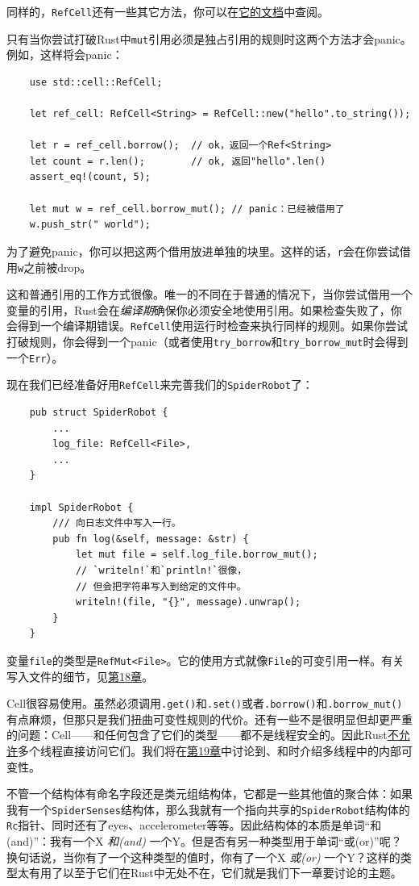 同样的，\texttt{RefCell}还有一些其它方法，你可以在\href{https://doc.rust-lang.org/std/cell/struct.RefCell.html}{它的文档}中查阅。

只有当你尝试打破Rust中\texttt{mut}引用必须是独占引用的规则时这两个方法才会panic。例如，这样将会panic：
\begin{verbatim}
    use std::cell::RefCell;

    let ref_cell: RefCell<String> = RefCell::new("hello".to_string());

    let r = ref_cell.borrow();  // ok，返回一个Ref<String>
    let count = r.len();        // ok, 返回"hello".len()
    assert_eq!(count, 5);       

    let mut w = ref_cell.borrow_mut(); // panic：已经被借用了
    w.push_str(" world");
\end{verbatim}

为了避免panic，你可以把这两个借用放进单独的块里。这样的话，\texttt{r}会在你尝试借用\texttt{w}之前被drop。

这和普通引用的工作方式很像。唯一的不同在于普通的情况下，当你尝试借用一个变量的引用，Rust会在\emph{编译期}确保你必须安全地使用引用。如果检查失败了，你会得到一个编译期错误。\texttt{RefCell}使用运行时检查来执行同样的规则。如果你尝试打破规则，你会得到一个panic（或者使用\texttt{try\_borrow}和\texttt{try\_borrow\_mut}时会得到一个\texttt{Err}）。

现在我们已经准备好用\texttt{RefCell}来完善我们的\texttt{SpiderRobot}了：
\begin{verbatim}
    pub struct SpiderRobot {
        ...
        log_file: RefCell<File>,
        ...
    }

    impl SpiderRobot {
        /// 向日志文件中写入一行。
        pub fn log(&self, message: &str) {
            let mut file = self.log_file.borrow_mut();
            // `writeln!`和`println!`很像，
            // 但会把字符串写入到给定的文件中。
            writeln!(file, "{}", message).unwrap();
        }
    }
\end{verbatim}

变量\texttt{file}的类型是\texttt{RefMut<File>}。它的使用方式就像\texttt{File}的可变引用一样。有关写入文件的细节，见\hyperref[ch18]{第18章}。

Cell很容易使用。虽然必须调用\texttt{.get()}和\texttt{.set()}或者\texttt{.borrow()}和\texttt{.borrow\_mut()}有点麻烦，但那只是我们扭曲可变性规则的代价。还有一些不是很明显但却更严重的问题：Cell——和任何包含了它们的类型——都不是线程安全的。因此Rust\hyperref[threadsafe]{不允许}多个线程直接访问它们。我们将在\hyperref[ch19]{第19章}中讨论到、和时介绍多线程中的内部可变性。

不管一个结构体有命名字段还是类元组结构体，它都是一些其他值的聚合体：如果我有一个\texttt{SpiderSenses}结构体，那么我就有一个指向共享的\texttt{SpiderRobot}结构体的\texttt{Rc}指针、同时还有了eyes、accelerometer等等。因此结构体的本质是单词“和(and)”：我有一个X \emph{和(and)} 一个Y。但是否有另一种类型用于单词“或(or)”呢？换句话说，当你有了一个这种类型的值时，你有了一个X \emph{或(or)} 一个Y？这样的类型太有用了以至于它们在Rust中无处不在，它们就是我们下一章要讨论的主题。
